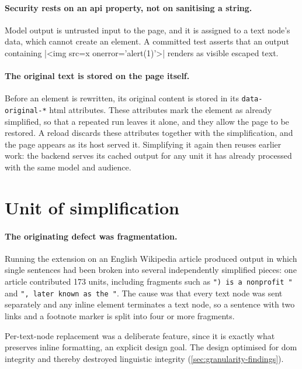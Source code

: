 \paragraph{Security rests on an \gls{api} property, not on sanitising a string.}
Model output is untrusted input to the page, and it is assigned to a text node's data, which cannot create an element.
A committed test asserts that an output containing \codeverb|<img src=x onerror='alert(1)'>| renders as visible escaped text.

\paragraph{The original text is stored on the page itself.}
Before an element is rewritten, its original content is stored in its \texttt{data-original-*} \gls{html} attributes.
These attributes mark the element as already simplified, so that a repeated run leaves it alone, and they allow the page to be restored.
A reload discards these attributes together with the simplification, and the page appears as its host served it.
Simplifying it again then reuses earlier work: the backend serves its cached output for any unit it has already processed with the same model and audience.

\section{Unit of simplification}
\label{sec:unit-of-simplification}

\paragraph{The originating defect was fragmentation.}
Running the extension on an English Wikipedia article produced output in which single sentences had been broken into several independently simplified pieces: one article contributed \num{173} units, including fragments such as \texttt{") is a nonprofit "} and \texttt{", later known as the "}.
The cause was that every text node was sent separately and any inline element terminates a text node, so a sentence with two links and a footnote marker is split into four or more fragments.

Per-text-node replacement was a deliberate feature, since it is exactly what preserves inline formatting, an explicit design goal.
The design optimised for \gls{dom} integrity and thereby destroyed linguistic integrity (\cref{sec:granularity-findings}).

